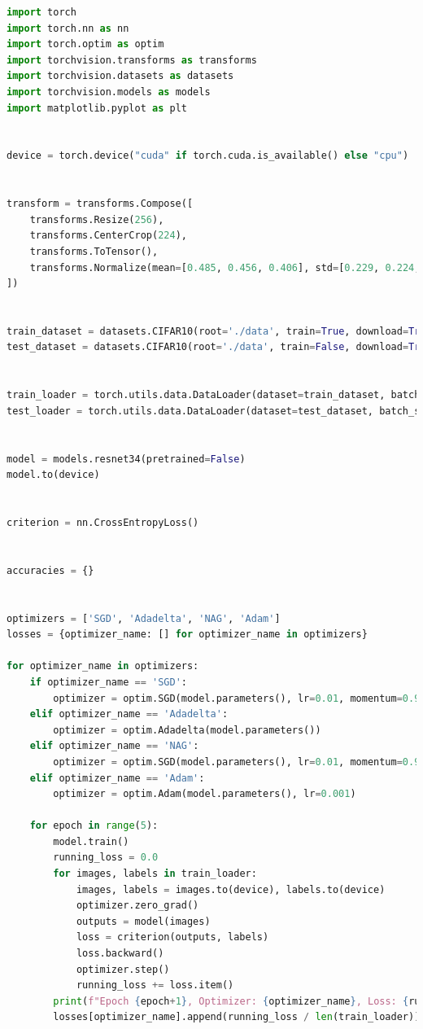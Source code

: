 \documentclass[a4paper, 14pt]{extarticle}
\begin{document}
\begin{lstlisting}[language={python},caption={ResNet (34)},label={lst:code3}]
import torch
import torch.nn as nn
import torch.optim as optim
import torchvision.transforms as transforms
import torchvision.datasets as datasets
import torchvision.models as models
import matplotlib.pyplot as plt


device = torch.device("cuda" if torch.cuda.is_available() else "cpu")


transform = transforms.Compose([
    transforms.Resize(256),
    transforms.CenterCrop(224),
    transforms.ToTensor(),
    transforms.Normalize(mean=[0.485, 0.456, 0.406], std=[0.229, 0.224, 0.225])
])


train_dataset = datasets.CIFAR10(root='./data', train=True, download=True, transform=transform)
test_dataset = datasets.CIFAR10(root='./data', train=False, download=True, transform=transform)


train_loader = torch.utils.data.DataLoader(dataset=train_dataset, batch_size=64, shuffle=True)
test_loader = torch.utils.data.DataLoader(dataset=test_dataset, batch_size=64, shuffle=False)


model = models.resnet34(pretrained=False)
model.to(device)


criterion = nn.CrossEntropyLoss()


accuracies = {}


optimizers = ['SGD', 'Adadelta', 'NAG', 'Adam']
losses = {optimizer_name: [] for optimizer_name in optimizers}

for optimizer_name in optimizers:
    if optimizer_name == 'SGD':
        optimizer = optim.SGD(model.parameters(), lr=0.01, momentum=0.9)
    elif optimizer_name == 'Adadelta':
        optimizer = optim.Adadelta(model.parameters())
    elif optimizer_name == 'NAG':
        optimizer = optim.SGD(model.parameters(), lr=0.01, momentum=0.9, nesterov=True)
    elif optimizer_name == 'Adam':
        optimizer = optim.Adam(model.parameters(), lr=0.001)

    for epoch in range(5):
        model.train()
        running_loss = 0.0
        for images, labels in train_loader:
            images, labels = images.to(device), labels.to(device)
            optimizer.zero_grad()
            outputs = model(images)
            loss = criterion(outputs, labels)
            loss.backward()
            optimizer.step()
            running_loss += loss.item()
        print(f"Epoch {epoch+1}, Optimizer: {optimizer_name}, Loss: {running_loss / len(train_loader)}")
        losses[optimizer_name].append(running_loss / len(train_loader))


\end{lstlisting}
\end{document}
